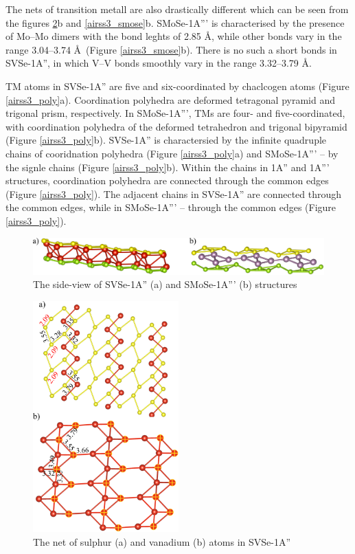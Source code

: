 \documentclass[a4paperm]{article}
\begin{document}
The nets of transition metall are also drastically different which can be seen from the figures \ref{airss3_svse}b and \ref{airss3_smose}b.
SMoSe-1A''' is characterised by the presence of Mo--Mo dimers with the bond leghts of 2.85 \AA, while other bonds vary in the range 3.04--3.74 \AA\ (Figure \ref{airss3_smose}b).
There is no such a short bonds in SVSe-1A'', in which V--V bonds smoothly vary in the range 3.32--3.79 \AA.

TM atoms in SVSe-1A'' are five and six-coordinated by chaclcogen atoms (Figure \ref{airss3_poly}a).
Coordination polyhedra are  deformed tetragonal pyramid and trigonal prism, respectively.
In SMoSe-1A''', TMs are four- and five-coordinated, with coordination polyhedra of the deformed tetrahedron and trigonal bipyramid (Figure \ref{airss3_poly}b).
SVSe-1A'' is charactersied by the infinite quadruple chains of cooridnation polyhedra (Figure \ref{airss3_poly}a) and SMoSe-1A''' -- by the signle chains (Figure \ref{airss3_poly}b).
Within the chains in 1A'' and 1A''' structures, coordination polyhedra are connected through the common edges (Figure \ref{airss3_poly}).
The adjacent chains in SVSe-1A'' are connected through the common edges, while in SMoSe-1A''' -- through the common edges (Figure \ref{airss3_poly}).

\begin{figure}[H]
	\includegraphics[width=\textwidth]{airss3_side.png}
	\caption{The side-view of SVSe-1A'' (a) and SMoSe-1A''' (b) structures}
	\label{airss3_side}
\end{figure}

\begin{figure}[H]
	\includegraphics[width=0.5\textwidth]{airss3_svse.png}
	\caption{The net of sulphur (a) and vanadium (b) atoms in SVSe-1A''}
	\label{airss3_svse}
\end{figure}
\end{document}
